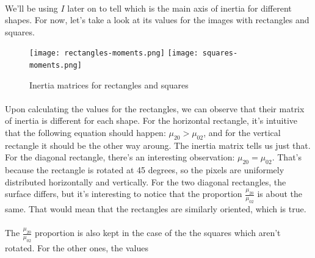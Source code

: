 \clearpage
\paragraph{}
We'll be using $I$ later on to tell which is the main axis of inertia for different shapes.
For now, let's take a look at its values for the images with rectangles and squares.
\begin{figure}[H]
    \centering
    \texttt{[image: rectangles-moments.png]}
    \texttt{[image: squares-moments.png]}
    \caption{Inertia matrices for rectangles and squares}
\end{figure}
\paragraph{}
Upon calculating the values for the rectangles, we can observe that their matrix of inertia is different for each shape.
For the horizontal rectangle, it's intuitive that the following equation should happen: $\mu_{20} > \mu_{02}$, and for the vertical rectangle it should be the other way aroung.
The inertia matrix tells us just that.
For the diagonal rectangle, there's an interesting observation: $\mu_{20} = \mu_{02}$. That's because the rectangle is rotated at 45 degrees, so the pixels are uniformely distributed horizontally and vertically.
For the two diagonal rectangles, the surface differs, but it's interesting to notice that the proportion $\frac{\mu_{20}}{\mu_{02}}$ is about the same. That would mean that the rectangles are similarly oriented, which is true.
\paragraph{}
The $\frac{\mu_{20}}{\mu_{02}}$ proportion is also kept in the case of the the squares which aren't rotated. For the other ones, the values 





